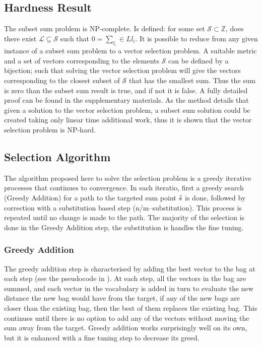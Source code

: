 \documentclass[]{scrartcl}
\numberwithin{equation}{section}
\numberwithin{figure}{section}
\theoremstyle{plain}
\theoremstyle{definition}
\begin{document}
\subsection{Hardness Result}
The subset sum problem is NP-complete\cite{karp1972reducibility}. Is defined: for some set $\mathcal{S}\subset\mathbb{Z}$, does there exist $\mathcal{L}\subseteq\mathcal{S}$ such that $0=\sum_{l_i}\in L l_i$.  It is possible to reduce from any given instance of a subset sum problem to a vector selection problem. A suitable metric and a set of vectors corresponding to the elements $\mathcal{S}$ can be defined by a bijection; such that solving the vector selection problem will give the vectors corresponding to the closest subset of $\mathcal{S}$ that has the smallest sum. Thus the sum is zero than the subset sum result is true, and if not it is false. A fully detailed proof can be found in the supplementary materials. As the method details that given a solution to the vector selection problem, a subset sum solution could be created taking only linear time additional work, thus it is shown that the vector selection problem is NP-hard.


\subsection{Selection Algorithm}
The algorithm proposed here to solve the selection problem is a greedy iterative processes that continues to convergence. In each iteratio, first a greedy search (Greedy Addition) for a path to the targeted sum point $\tilde{s}$ is done, followed by correction with a substitution based step (n/m--substitution). This process is repeated until no change is made to the path. The majority of the selection is done in the Greedy Addition step, the substitution is handles the fine tuning.

\subsubsection{Greedy Addition}
The greedy addition step is characterised by adding the best vector to the bag at each step (see the pseudocode in ). At each step, all the vectors in the bag are summed, and each vector in the vocabulary is added in turn to evaluate the new distance the new bag would have from the target, if any of the new bags are closer than the existing bag, then the best of them replaces the existing bag. This continues until there is no option to add any of the vectors without moving the sum away from the target. Greedy addition works surprisingly well on its own, but it is enhanced with a fine tuning step to decrease its greed.
\end{document}
